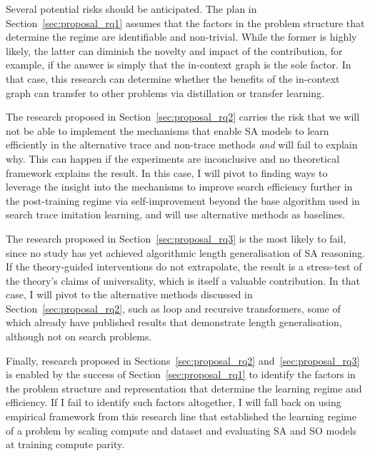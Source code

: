 Several potential risks should be anticipated.
The plan in Section~\ref{sec:proposal_rq1} assumes that the factors in the problem structure that determine the regime are identifiable and non-trivial.
While the former is highly likely, the latter can diminish the novelty and impact of the contribution, for example, if the answer is simply that the in-context graph is the sole factor.
In that case, this research can determine whether the benefits of the in-context graph can transfer to other problems via distillation or transfer learning.

The research proposed in Section~\ref{sec:proposal_rq2} carries the risk that we will not be able to implement the mechanisms that enable SA models to learn efficiently in the alternative trace and non-trace methods \textit{and} will fail to explain why.
This can happen if the experiments are inconclusive and no theoretical framework explains the result.
In this case, I will pivot to finding ways to leverage the insight into the mechanisms to improve search efficiency further in the post-training regime via self-improvement beyond the base algorithm used in search trace imitation learning, and will use alternative methods as baselines.

The research proposed in Section~\ref{sec:proposal_rq3} is the most likely to fail, since no study has yet achieved algorithmic length generalisation of SA reasoning.
If the theory-guided interventions do not extrapolate, the result is a stress-test of the theory's claims of universality, which is itself a valuable contribution.
In that case, I will pivot to the alternative methods discussed in Section~\ref{sec:proposal_rq2}, such as loop and recursive transformers, some of which already have published results that demonstrate length generalisation, although not on search problems.

Finally, research proposed in Sections~\ref{sec:proposal_rq2} and~\ref{sec:proposal_rq3} is enabled by the success of Section~\ref{sec:proposal_rq1} to identify the factors in the problem structure and representation that determine the learning regime and efficiency. If I fail to identify such factors altogether, I will fall back on using empirical framework from this research line that established the learning regime of a problem by scaling compute and dataset and evaluating SA and SO models at training compute parity.
